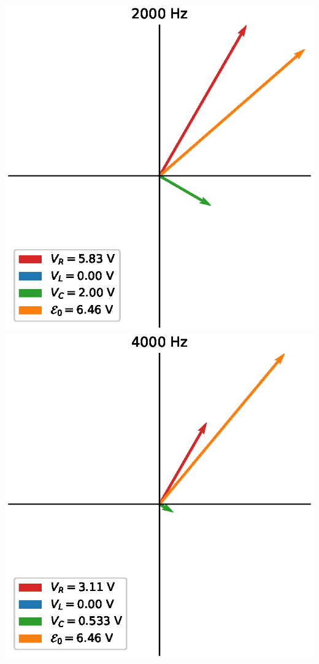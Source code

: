 \documentclass[12pt]{iopart} %
\begin{document}
\includegraphics{media/part_1_2000_hz.eps}
\includegraphics{media/part_1_4000_hz.eps}
\end{document}
